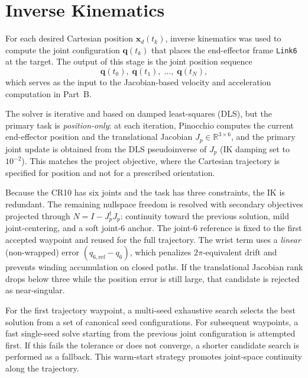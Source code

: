 \documentclass[12pt,a4paper]{article}
\begin{document}
\section{Inverse Kinematics}

For each desired Cartesian position $\bm{x}_d(t_k)$, inverse kinematics was used to compute
the joint configuration $\bm{q}(t_k)$ that places the end-effector frame \texttt{Link6} at
the target. The output of this stage is the joint position sequence
\begin{equation}
    \bm{q}(t_0),\;\bm{q}(t_1),\;\ldots,\;\bm{q}(t_N),
\end{equation}
which serves as the input to the Jacobian-based velocity and acceleration computation in
Part~B.

The solver is iterative and based on damped least-squares (DLS), but the primary task is
\emph{position-only}: at each iteration, Pinocchio computes the current end-effector position
and the translational Jacobian $J_p \in \mathbb{R}^{3\times 6}$, and the primary joint update
is obtained from the DLS pseudoinverse of $J_p$ (IK damping set to $10^{-2}$). This matches the
project objective, where the Cartesian trajectory is specified for position and not for a
prescribed orientation.

Because the CR10 has six joints and the task has three constraints, the IK is redundant. The
remaining nullspace freedom is resolved with secondary objectives projected through
$N = I - J_p^\dagger J_p$: continuity toward the previous solution, mild joint-centering, and
a soft joint-6 anchor. The joint-6 reference is fixed to the first accepted waypoint and reused
for the full trajectory. The wrist term uses a \emph{linear} (non-wrapped) error
$(q_{6,\mathrm{ref}}-q_6)$, which penalizes $2\pi$-equivalent drift and prevents winding
accumulation on closed paths.
If the translational Jacobian rank drops below three while the position error is still large,
that candidate is rejected as near-singular.

For the first trajectory waypoint, a multi-seed exhaustive search selects the best solution
from a set of canonical seed configurations. For subsequent waypoints, a fast single-seed
solve starting from the previous joint configuration is attempted first. If this fails the
tolerance or does not converge, a shorter candidate search is performed as a fallback. This
warm-start strategy promotes joint-space continuity along the trajectory.
\end{document}
